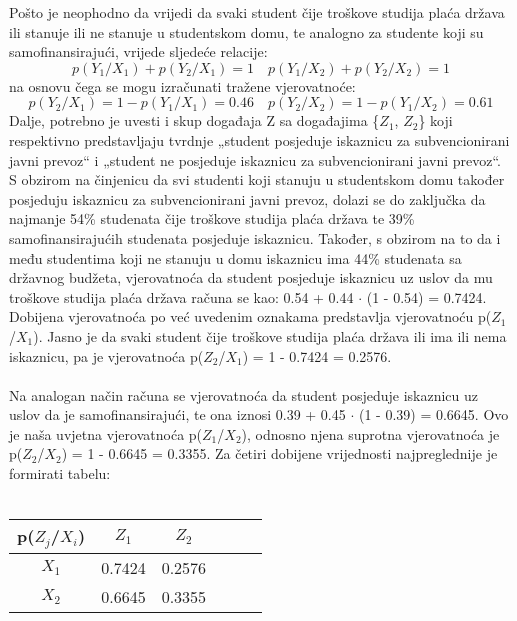\documentclass[12pt]{article}
\begin{document}
\begin{enumerate}
Pošto je neophodno da vrijedi da svaki student čije troškove studija plaća država ili stanuje ili ne
stanuje u studentskom domu, te analogno za studente koji su samofinansirajući, vrijede sljedeće relacije:
\begin{equation*}
    p(Y_1/X_1) + p(Y_2/X_1) = 1 \quad p(Y_1/X_2) + p(Y_2/X_2) = 1
\end{equation*}
na osnovu čega se mogu izračunati tražene vjerovatnoće:
\begin{equation*}
    p(Y_2/X_1) = 1 - p(Y_1/X_1) = 0.46 \quad p(Y_2/X_2) = 1 - p(Y_1/X_2) = 0.61
\end{equation*}
Dalje, potrebno je uvesti i skup događaja Z sa događajima \{$Z_1$, $Z_2$\} koji respektivno predstavljaju
tvrdnje „student posjeduje iskaznicu za subvencionirani javni prevoz“ i „student ne posjeduje
iskaznicu za subvencionirani javni prevoz“. S obzirom na činjenicu da svi studenti koji stanuju u
studentskom domu također posjeduju iskaznicu za subvencionirani javni prevoz, dolazi se do
zaključka da najmanje 54\% studenata čije troškove studija plaća država te 39\%
samofinansirajućih studenata posjeduje iskaznicu. Također, s obzirom na to da i među studentima
koji ne stanuju u domu iskaznicu ima 44\% studenata sa državnog budžeta, vjerovatnoća da
student posjeduje iskaznicu uz uslov da mu troškove studija plaća država računa se kao:		
0.54 + 0.44 ${\cdot}$ (1 - 0.54) = 0.7424. Dobijena vjerovatnoća po već uvedenim
oznakama predstavlja vjerovatnoću p($Z_1$/$X_1$).  Jasno je da svaki student čije troškove studija plaća
država ili ima ili nema iskaznicu, pa je vjerovatnoća p($Z_2$/$X_1$) = 1 - 0.7424 = 0.2576.
\\
\\
Na analogan način računa se vjerovatnoća da student posjeduje iskaznicu uz uslov da je samofinansirajući, te ona iznosi 0.39 + 0.45 ${\cdot}$ (1 - 0.39) = 0.6645. Ovo je naša uvjetna vjerovatnoća p($Z_1$/$X_2$), odnosno njena suprotna vjerovatnoća je p($Z_2$/$X_2$) = 1 - 0.6645 = 0.3355. Za četiri dobijene vrijednosti najpreglednije je formirati tabelu: \\
\\
\begin{tabular}{|c|c|c|c|c|c|}
\hline
p(${Z_j}$/${X_i}$) & ${Z_1}$   &  ${Z_2}$ \\ \hline
${X_1}$                           & 0.7424  & 0.2576 \\ \hline
${X_2}$                          & 0.6645 & 0.3355 \\ \hline
\end{tabular} \\


\end{enumerate}
\end{document}
